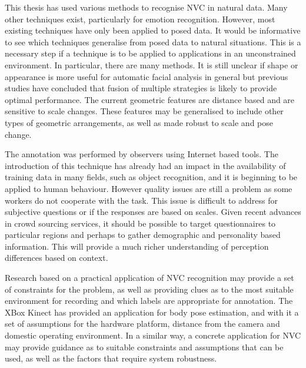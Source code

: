 
This thesis has used various methods to recognise \ac{NVC} in natural data. Many other techniques exist, particularly for emotion recognition. However, most existing techniques have only been applied to posed data. It would be informative to see which techniques generalise from posed data to natural situations. This is a necessary step if a technique is to be applied to applications in an unconstrained environment. In particular, there are many \featureGeneration methods. It is still unclear if shape or appearance is more useful for automatic facial analysis in general but previous studies have concluded that fusion of multiple strategies is likely to provide optimal performance. The current geometric features are distance based and are sensitive to scale changes. These features may be generalised to include other types of geometric arrangements, as well as made robust to scale and pose change.





The annotation was performed by observers using Internet based tools. The introduction of this technique has already had an impact in the availability of training data in many fields, such as object recognition, and it is beginning to be applied to human behaviour. However quality issues are still a problem as some workers do not cooperate with the task. This issue is difficult to address for subjective questions or if the responses are based on \continuous scales. Given recent advances in crowd sourcing services, it should be possible to target questionnaires to particular regions and perhaps to gather demographic and personality based information. This will provide a much richer understanding of perception differences based on context.

Research based on a practical application of \ac{NVC} recognition may provide a set of constraints for the problem, as well as providing clues as to the most suitable environment for recording and which labels are appropriate for annotation. The XBox Kinect has provided an application for body pose estimation, and with it a set of assumptions for the hardware platform, distance from the camera and domestic operating environment. In a similar way, a concrete application for \ac{NVC} may provide guidance as to suitable constraints and assumptions that can be used, as well as the factors that require system robustness.

